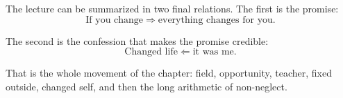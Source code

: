The lecture can be summarized in two final relations. The first is the promise:
\begin{equation}
\text{If you change} \Longrightarrow \text{everything changes for you}.
\end{equation}

The second is the confession that makes the promise credible:
\begin{equation}
\text{Changed life} \Longleftarrow \text{it was me}.
\end{equation}

That is the whole movement of the chapter: field, opportunity, teacher, fixed outside, changed self, and then the long arithmetic of non-neglect.